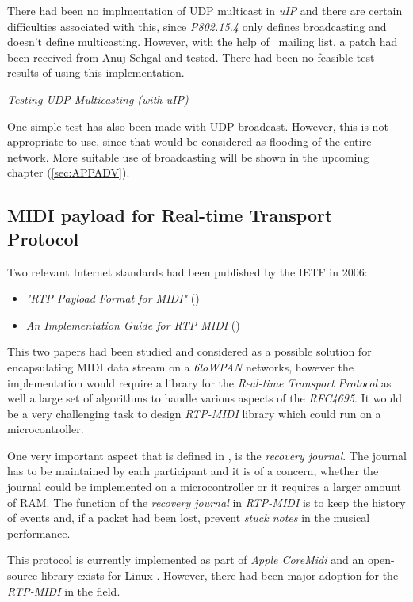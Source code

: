   There had been no implmentation of UDP multicast in \emph{uIP} and there 
 are certain difficulties associated with this, since \emph{P802.15.4}
 only defines broadcasting and doesn't define multicasting. However,
 with the help of \Contiki\ mailing list, a patch had been received from
 Anuj Sehgal and tested. There had been no feasible test results of using
 this implementation.

 \TrackerList\em
  Testing UDP Multicasting (with uIP)
 \TrackerEnd

  One simple test has also been made with UDP broadcast. However, this
  is not appropriate to use, since that would be considered as flooding
  of the entire network. More suitable use of broadcasting will be shown
  in the upcoming chapter (\ref{sec:APPADV}).


\subsection{MIDI payload for Real-time Transport Protocol}

 Two relevant Internet standards had been published by the IETF in 2006:
 \begin{itemize}
  \item\emph{"RTP Payload Format for MIDI"} ()
  \item\emph{An Implementation Guide for RTP MIDI} ()
 \end{itemize}

 This two papers had been studied and considered as a possible solution
 for encapsulating MIDI data stream on a \emph{6loWPAN} networks, however
 the implementation would require a library for the \emph{Real-time
 Transport Protocol} as well a large set of algorithms to handle various
 aspects of the \emph{RFC4695}. It would be a very challenging task to
 design \emph{RTP-MIDI} library which could run on a microcontroller.

  One very important aspect that is defined in , is the
 \emph{recovery journal}. The journal has to be maintained by each
 participant and it is of a concern, whether the journal could be
 implemented on a microcontroller or it requires a larger amount
 of RAM. The function of the \emph{recovery journal} in \emph{RTP-MIDI}
 is to keep the history of events and, if a packet had been lost, prevent
 \emph{stuck notes} in the musical performance.
 
 This protocol is currently implemented as part of \emph{Apple CoreMidi}
 \cite{links:wiki:rtpmidi} and an open-source library exists for Linux
 \cite{links:rtpmidi}. However, there had been major adoption for the
 \emph{RTP-MIDI} in the field.

